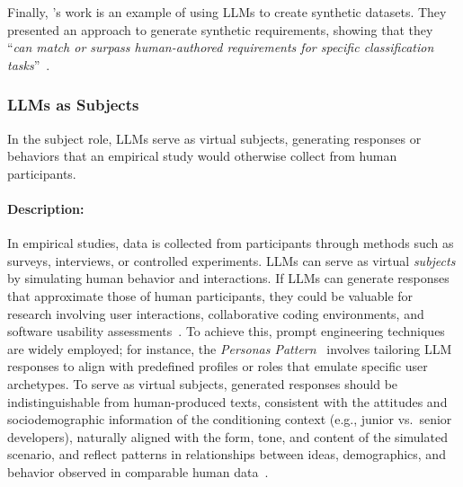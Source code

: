 \documentclass[smallextended]{svjour3}
\newcommand*{\enq}[1]{\enquote{{\itshape#1}}}
\newcommand{\studytypesubsection}[1]{\subsubsection{#1}}
\newcommand{\studytypeparagraph}[1]{\paragraph{\bfseries #1:}}
\newcommand{\studytypesubsection}[1]{\subsection{#1}}
\newcommand{\studytypeparagraph}[1]{\subsubsection{#1}}
\begin{document}
Finally, \citeauthor{DBLP:journals/corr/abs-2506-21138}'s work is an example of using LLMs to create synthetic datasets.
They presented an approach to generate synthetic requirements, showing that they \enq{can match or surpass human-authored requirements for specific classification tasks}~\cite{DBLP:journals/corr/abs-2506-21138}.
\space%

\studytypesubsection{LLMs as Subjects}
\label{sec:llms-as-subjects}

In the subject role, LLMs serve as virtual subjects, generating responses or behaviors that an empirical study would otherwise collect from human participants.

\studytypeparagraph{Description}

In empirical studies, data is collected from participants through methods such as surveys, interviews, or controlled experiments.
LLMs can serve as virtual \emph{subjects} by simulating human behavior and interactions. If LLMs can generate responses that approximate those of human participants, they could be valuable for research involving user interactions, collaborative coding environments, and software usability assessments~\cite{ZHAO2025101167}.
To achieve this, prompt engineering techniques are widely employed; for instance, the \textit{Personas Pattern}~\cite{DBLP:conf/naacl/KongZCLQSZWD24} involves tailoring LLM responses to align with predefined profiles or roles that emulate specific user archetypes.
To serve as virtual subjects, generated responses should be indistinguishable from human-produced texts, consistent with the attitudes and sociodemographic information of the conditioning context (e.g., junior vs.\ senior developers), naturally aligned with the form, tone, and content of the simulated scenario, and reflect patterns in relationships between ideas, demographics, and behavior observed in comparable human data~\cite{DBLP:journals/corr/abs-2209-06899}.
\end{document}
